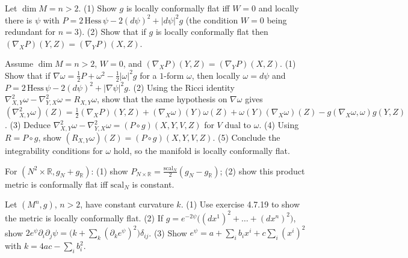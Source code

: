 \begin{remark}
  \label{rem:pet-ch4-ex-18}

  Let $\dim M=n>2$. (1) Show $g$ is locally conformally flat iff $W=0$ and
  locally there is $\psi$ with
  $P=2\,\mathrm{Hess}\,\psi-2(d\psi)^2+|d\psi|^2g$ (the condition $W=0$ being
  redundant for $n=3$). (2) Show that if $g$ is locally conformally flat then
  $(\nabla_XP)(Y,Z)=(\nabla_YP)(X,Z)$.
\end{remark}

\begin{remark}
  \label{rem:pet-ch4-ex-19}

  Assume $\dim M=n>2$, $W=0$, and $(\nabla_XP)(Y,Z)=(\nabla_YP)(X,Z)$. (1) Show
  that if $\nabla\omega=\tfrac12P+\omega^2-\tfrac12|\omega|^2g$ for a $1$-form
  $\omega$, then locally $\omega=d\psi$ and
  $P=2\,\mathrm{Hess}\,\psi-2(d\psi)^2+|\nabla\psi|^2g$. (2) Using the Ricci
  identity $\nabla^2_{X,Y}\omega-\nabla^2_{Y,X}\omega=R_{X,Y}\omega$, show that
  the same hypothesis on $\nabla\omega$ gives
  $(\nabla^2_{X,Y}\omega)(Z)=\tfrac12(\nabla_XP)(Y,Z)+(\nabla_X\omega)(Y)\omega(Z)+\omega(Y)(\nabla_X\omega)(Z)-g(\nabla_X\omega,\omega)g(Y,Z)$.
  (3) Deduce $\nabla^2_{X,Y}\omega-\nabla^2_{Y,X}\omega=(P\circ g)(X,Y,V,Z)$ for
  $V$ dual to $\omega$. (4) Using $R=P\circ g$, show
  $(R_{X,Y}\omega)(Z)=(P\circ g)(X,Y,V,Z)$. (5) Conclude the integrability
  conditions for $\omega$ hold, so the manifold is locally conformally flat.
\end{remark}

\begin{remark}
  \label{rem:pet-ch4-ex-20}

  For $(N^2\times\mathbb{R},g_N+g_{\mathbb{R}})$: (1) show
  $P_{N\times\mathbb{R}}=\tfrac{\mathrm{scal}_N}2(g_N-g_{\mathbb{R}})$; (2) show this product
  metric is conformally flat iff $\mathrm{scal}_N$ is constant.
\end{remark}

\begin{remark}
  \label{rem:pet-ch4-ex-21}

  Let $(M^n,g)$, $n>2$, have constant curvature $k$. (1) Use exercise 4.7.19
  to show the metric is locally conformally flat. (2) If
  $g=e^{-2\psi}\big((dx^1)^2+\dots+(dx^n)^2\big)$, show
  $2e^\psi\partial_i\partial_j\psi=\big(k+\sum_k(\partial_ke^\psi)^2\big)\delta_{ij}$.
  (3) Show $e^\psi=a+\sum_ib_ix^i+c\sum_i(x^i)^2$ with $k=4ac-\sum_ib_i^2$.
\end{remark}

